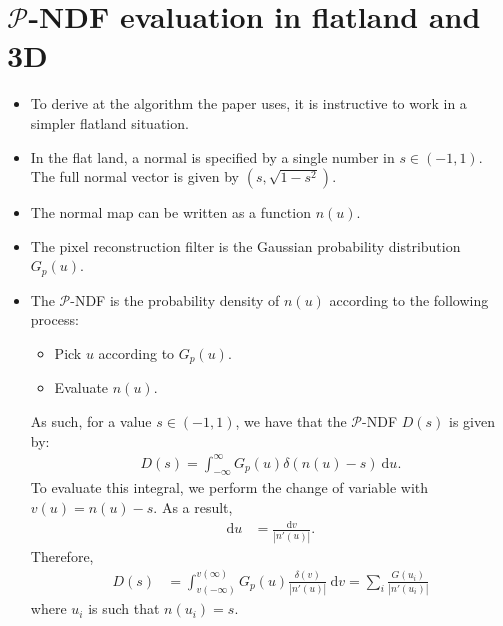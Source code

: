 \documentclass[10pt]{article}
\newcommand{\dee}{\mathrm{d}}
\begin{document}
  \section{$\mathcal{P}$-NDF evaluation in flatland and 3D}
  \begin{itemize}
  	\item To derive at the algorithm the paper uses, it is instructive to work in a simpler flatland situation.

  	\item In the flat land, a normal is specified by a single number in $s \in (-1,1)$.  The full normal vector is given by $(s, \sqrt{1-s^2})$.

  	\item The normal map can be written as a function $n(u)$.

  	\item The pixel reconstruction filter is the Gaussian probability distribution $G_p(u)$.

  	\item The $\mathcal{P}$-NDF is the probability density of $n(u)$ according to the following process:
  	\begin{itemize}
  		\item Pick $u$ according to $G_p(u)$.
  		\item Evaluate $n(u)$.
  	\end{itemize}
  	As such, for a value $s \in (-1,1)$, we have that the $\mathcal{P}$-NDF $D(s)$ is given by:
  	\begin{align*}
  		D(s) = \int_{-\infty}^\infty G_p(u) \delta(n(u) - s)\ \dee u.
  	\end{align*}
  	To evaluate this integral, we perform the change of variable with $v(u) = n(u) - s$.  As a result,
  	\begin{align*}  		
  		\dee u &= \frac{\dee v}{|n'(u)|}.
  	\end{align*}
  	Therefore,
  	\begin{align*}
  		D(s) 
  		&= \int_{v(-\infty)}^{v(\infty)} G_p(u) \frac{\delta(v)}{|n'(u)|}\ \dee v
  		= \sum_{i} \frac{G(u_i)}{|n'(u_i)|}
  	\end{align*}
  	where $u_i$ is such that $n(u_i) = s$.


\end{itemize}
\end{document}
